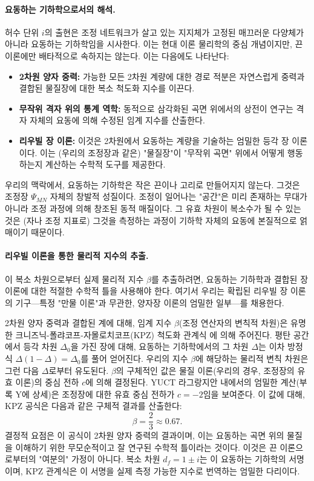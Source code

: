 \documentclass[11pt,a4paper]{article}
\theoremstyle{remark}
\begin{document}
	\paragraph{요동하는 기하학으로서의 해석.}
	허수 단위 \(i\)의 출현은 조정 네트워크가 살고 있는 지지체가 고정된 매끄러운 다양체가 아니라 요동하는 기하학임을 시사한다. 이는 현대 이론 물리학의 중심 개념이지만, 끈 이론에만 배타적으로 속하지는 않는다. 이는 다음에도 나타난다:
	\begin{itemize}
		\item \textbf{2차원 양자 중력:} 가능한 모든 2차원 계량에 대한 경로 적분은 자연스럽게 중력과 결합된 물질장에 대한 복소 척도화 지수를 이끈다.
		\item \textbf{무작위 격자 위의 통계 역학:} 동적으로 삼각화된 곡면 위에서의 상전이 연구는 격자 자체의 요동에 의해 수정된 임계 지수를 산출한다.
		\item \textbf{리우빌 장 이론:} 이것은 2차원에서 요동하는 계량을 기술하는 엄밀한 등각 장 이론이다. 이는 (우리의 조정장과 같은) "물질장"이 "무작위 곡면" 위에서 어떻게 행동하는지 계산하는 수학적 도구를 제공한다.
	\end{itemize}
	우리의 맥락에서, 요동하는 기하학은 작은 끈이나 고리로 만들어지지 않는다. 그것은 조정장 \(\Psi_{MN}\) 자체의 창발적 성질이다. 조정이 일어나는 "공간"은 미리 존재하는 무대가 아니라 조정 과정에 의해 창조된 동적 매질이다. 그 유효 차원이 복소수가 될 수 있는 것은 (자나 조정 지표로) 그것을 측정하는 과정이 기하학 자체의 요동에 본질적으로 얽매이기 때문이다.
	
	\paragraph{리우빌 이론을 통한 물리적 지수의 추출.}
	이 복소 차원으로부터 실제 물리적 지수 \(\beta\)를 추출하려면, 요동하는 기하학과 결합된 장 이론에 대한 적절한 수학적 틀을 사용해야 한다. 여기서 우리는 확립된 리우빌 장 이론의 기구—특정 "만물 이론"과 무관한, 양자장 이론의 엄밀한 일부—를 채용한다.
	
	2차원 양자 중력과 결합된 계에 대해, 임계 지수 \(\beta\)(조정 연산자의 변칙적 차원)은 유명한 크니즈닉-폴랴코프-자몰로치코프(KPZ) 척도화 관계식 \cite{Knizhnik1988}에 의해 주어진다. 평탄 공간에서 등각 차원 \(\Delta_0\)을 가진 장에 대해, 요동하는 기하학에서의 그 차원 \(\Delta\)는 이차 방정식 \(\Delta(1-\Delta) = \Delta_0\)를 풀어 얻어진다. 우리의 지수 \(\beta\)에 해당하는 물리적 변칙 차원은 그런 다음 \(\Delta\)로부터 유도된다. \(\beta\)의 구체적인 값은 물질 이론(우리의 경우, 조정장의 유효 이론)의 중심 전하 \(c\)에 의해 결정된다. YUCT 라그랑지안 내에서의 엄밀한 계산(부록 Y에 상세)은 조정장에 대한 유효 중심 전하가 \(c = -2\)임을 보여준다. 이 값에 대해, KPZ 공식은 다음과 같은 구체적 결과를 산출한다:
	\begin{equation}
		\beta = \frac{2}{3} \approx 0.67.
		\label{eq:beta_final}
	\end{equation}
	결정적 요점은 이 공식이 2차원 양자 중력의 결과이며, 이는 요동하는 곡면 위의 물질을 이해하기 위한 무모순적이고 잘 연구된 수학적 틀이라는 것이다. 이것은 끈 이론으로부터의 "여분의" 가정이 아니다. 복소 차원 \(d_f = 1 \pm i\)는 이 요동하는 기하학의 서명이며, KPZ 관계식은 이 서명을 실제 측정 가능한 지수로 번역하는 엄밀한 다리이다.
	
\end{document}
